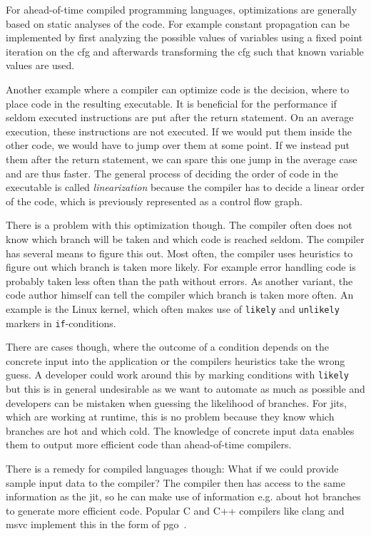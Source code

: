 For ahead-of-time compiled programming languages, optimizations are generally based on static analyses of the code. For example constant propagation can be implemented by first analyzing the possible values of variables using a fixed point iteration on the \gls{cfg} and afterwards transforming the \gls{cfg} such that known variable values are used.~\cite{Seidl2010}

Another example where a compiler can optimize code is the decision, where to place code in the resulting executable. It is beneficial for the performance if seldom executed instructions are put after the return statement. On an average execution, these instructions are not executed. If we would put them inside the other code, we would have to jump over them at some point. If we instead put them after the return statement, we can spare this one jump in the average case and are thus faster. The general process of deciding the order of code in the executable is called \emph{linearization} because the compiler has to decide a linear order of the code, which is previously represented as a control flow graph.

There is a problem with this optimization though. The compiler often does not know which branch will be taken and which code is reached seldom. The compiler has several means to figure this out. Most often, the compiler uses heuristics to figure out which branch is taken more likely. For example error handling code is probably taken less often than the path without errors. As another variant, the code author himself can tell the compiler which branch is taken more often. An example is the Linux kernel, which often makes use of \texttt{likely} and \texttt{unlikely} markers in \texttt{if}-conditions.

There are cases though, where the outcome of a condition depends on the concrete input into the application or the compilers heuristics take the wrong guess. A developer could work around this by marking conditions with \texttt{likely} but this is in general undesirable as we want to automate as much as possible and developers can be mistaken when guessing the likelihood of branches. For \glspl{jit}, which are working at runtime, this is no problem because they know which branches are hot and which cold. The knowledge of concrete input data enables them to output more efficient code than ahead-of-time compilers.

There is a remedy for compiled languages though: What if we could provide sample input data to the compiler? The compiler then has access to the same information as the \gls{jit}, so he can make use of information e.g. about hot branches to generate more efficient code. Popular C and C++ compilers like clang and msvc implement this in the form of \gls{pgo}~\cite{ClangManual, MicrosoftPgo}.

